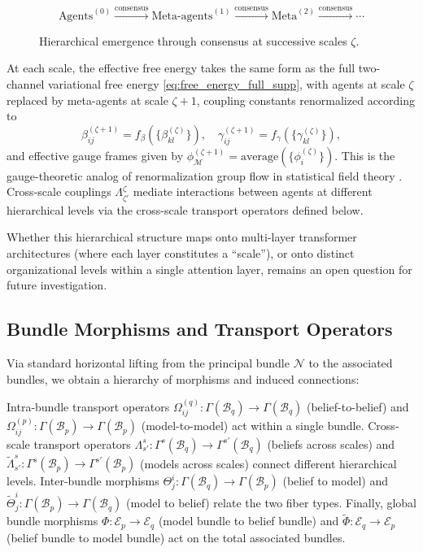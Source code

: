 \documentclass[twoside,11pt]{article}
\begin{document}
\begin{figure}[h]
\centering
\small
\[
\text{Agents}^{(0)} \xrightarrow{\text{consensus}}
\text{Meta-agents}^{(1)} \xrightarrow{\text{consensus}}
\text{Meta}^{(2)} \xrightarrow{\text{consensus}} \cdots
\]
\caption{Hierarchical emergence through consensus at successive scales $\zeta$.}
\label{fig:hierarchy}
\end{figure}

At each scale, the effective free energy takes the same form as the full two-channel variational free energy \eqref{eq:free_energy_full_supp}, with agents at scale $\zeta$ replaced by meta-agents at scale $\zeta+1$, coupling constants renormalized according to
\begin{equation*}
  \beta_{ij}^{(\zeta+1)} = f_\beta(\{\beta_{kl}^{(\zeta)}\}), \quad
  \gamma_{ij}^{(\zeta+1)} = f_\gamma(\{\gamma_{kl}^{(\zeta)}\}),
\end{equation*}
and effective gauge frames given by $\phi_{\mathcal{M}}^{(\zeta+1)} = \text{average}(\{\phi_i^{(\zeta)}\})$.
This is the gauge-theoretic analog of renormalization group flow in statistical field theory \citep{anderson1984basic,wilson1974renormalization,garciaperez2018multiscale}. Cross-scale couplings $\Lambda^{\zeta}_{\zeta'}$ mediate interactions between agents at different hierarchical levels via the cross-scale transport operators defined below.

Whether this hierarchical structure maps onto multi-layer transformer architectures (where each layer constitutes a ``scale''), or onto distinct organizational levels within a single attention layer, remains an open question for future investigation.

\subsection{Bundle Morphisms and Transport Operators}
Via standard horizontal lifting from the principal bundle $\mathcal{N}$ to the associated bundles, we obtain a hierarchy of morphisms and induced connections:

Intra-bundle transport operators $\Omega^{(q)}_{ij}: \Gamma(\mathcal{B}_q) \to \Gamma(\mathcal{B}_q)$ (belief-to-belief) and $\Omega^{(p)}_{ij}: \Gamma(\mathcal{B}_p) \to \Gamma(\mathcal{B}_p)$ (model-to-model) act within a single bundle. Cross-scale transport operators $\Lambda^{s}_{s'}: \Gamma^{s}(\mathcal{B}_q) \to \Gamma^{s'}(\mathcal{B}_q)$ (beliefs across scales) and $\tilde{\Lambda}^{s}_{s'}: \Gamma^{s}(\mathcal{B}_p) \to \Gamma^{s'}(\mathcal{B}_p)$ (models across scales) connect different hierarchical levels. Inter-bundle morphisms $\Theta^i_j: \Gamma(\mathcal{B}_q) \to \Gamma(\mathcal{B}_p)$ (belief to model) and $\tilde{\Theta}^i_j: \Gamma(\mathcal{B}_p) \to \Gamma(\mathcal{B}_q)$ (model to belief) relate the two fiber types. Finally, global bundle morphisms $\Phi: \mathcal{E}_p \to \mathcal{E}_q$ (model bundle to belief bundle) and $\tilde{\Phi}: \mathcal{E}_q \to \mathcal{E}_p$ (belief bundle to model bundle) act on the total associated bundles.
\end{document}
